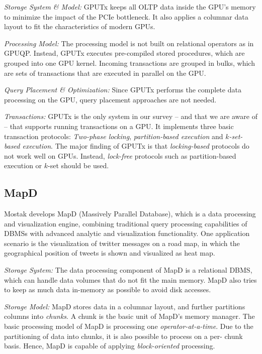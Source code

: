 \documentclass[twocolumn]{article}
\begin{document}
\noindent
\textit{Storage System \& Model:}
GPUTx keeps all OLTP data inside the GPU’s memory to minimize the impact of the PCIe bottleneck. 
It also applies a columnar data layout to fit the characteristics of modern GPUs.

\noindent
\textit{Processing Model:} The processing model is not built on relational operators as in GPUQP. Instead, GPUTx executes pre-compiled stored procedures, which are grouped into one GPU kernel. Incoming transactions are grouped in bulks, which are sets of transactions that are executed in parallel on the GPU.

\noindent
\textit{Query Placement \& Optimization:}
Since GPUTx performs the complete data processing on the GPU, query placement approaches are not needed.

\noindent
\textit{Transactions:}
GPUTx is the only system in our survey – and that we are aware of – that supports running transactions on a GPU. It implements three basic transaction protocols: \textit{Two-phase locking}, \textit{partition-based execution} and $k$\textit{-set- based execution}. The major finding of GPUTx is that \textit{locking-based} protocols do not work well on GPUs. 
Instead, \textit{lock-free} protocols such as partition-based execution or $k$-set should be used.

\subsection{MapD}
Mostak develops MapD (Massively Parallel Database), which is a data processing and visualization engine, combining traditional query processing capabilities of DBMSs with advanced analytic and visualization functionality. 
One application scenario is the visualization of twitter messages on a road map, in which the geographical position of tweets is shown and visualized as heat map.

\noindent
\textit{Storage System:} The data processing component of MapD is a relational DBMS, which can handle data volumes that do not fit the main memory. MapD also tries to keep as much data in-memory as possible to avoid disk accesses.

\noindent
\textit{Storage Model:} 
MapD stores data in a columnar layout, and further partitions columns into \textit{chunks}. 
A chunk is the basic unit of MapD's memory manager. 
The basic processing model of MapD is processing one \textit{operator-at-a-time}. 
Due to the partitioning of data into chunks, it is also possible to process on a per- chunk basis. Hence, MapD is capable of applying \textit{block-oriented} processing.
\end{document}

